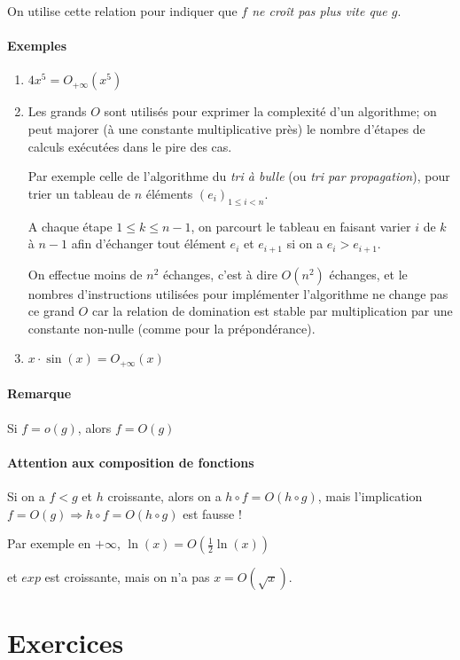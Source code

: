 \documentclass[]{article}
\begin{document}
On utilise cette relation pour indiquer que \textit{$f$ ne croît pas plus vite que $g$}.

\paragraph{Exemples}
\begin{enumerate}
	\item $4x^5=O_{+\infty}(x^5)$
	
	\item Les grands $O$ sont utilisés pour exprimer la complexité d'un algorithme; on peut majorer (à une constante multiplicative près) le nombre d'étapes de calculs exécutées dans le pire des cas.
	
	Par exemple celle de l'algorithme du \textit{tri à bulle} (ou \textit{tri par propagation}), pour trier un tableau de $n$ éléments $(e_i)_{1 \leqslant i < n}$.
	
	A chaque étape $1 \leqslant k \leqslant n-1$, on parcourt le tableau en faisant varier $i$ de $k$ à $n-1$ afin d'échanger tout élément $e_i$ et $e_{i+1}$ si on a $e_i > e_{i+1}$.
	
	On effectue moins de $n^2$ échanges, c'est à dire $O(n^2)$ échanges, et le nombres d'instructions utilisées pour implémenter l'algorithme ne change pas ce grand $O$ car la relation de domination est stable par multiplication par une constante non-nulle (comme pour la prépondérance).
	
	\item $x \cdot \sin(x) = O_{+\infty}(x)$
\end{enumerate}

\paragraph{Remarque}
Si $f=o(g)$, alors $f=O(g)$

\paragraph{Attention aux composition de fonctions}
Si on a $f < g$ et $h$ croissante, alors on a $h \circ f = O(h \circ g)$, mais l'implication $f=O(g) \Longrightarrow h \circ f = O(h \circ g)$ est fausse !

Par exemple en $+\infty$, $\ln(x)=O\left(\frac{1}{2}\ln(x)\right)$

et $exp$ est croissante, mais on n'a pas $x = O(\sqrt{x})$.

\section{Exercices}
\end{document}

